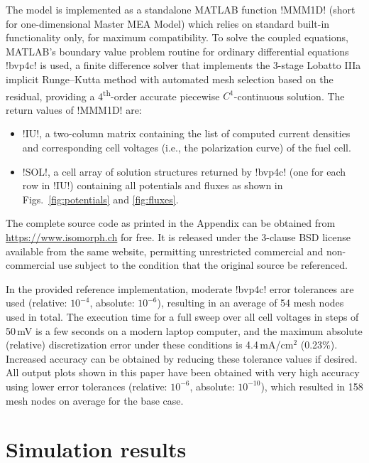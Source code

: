 \documentclass[fontsize=9pt,DIV=calc,a4paper,twocolumn]{scrartcl}
\begin{document}
The model is implemented as a standalone MATLAB function !MMM1D! (short for one-dimensional Master MEA Model) which relies on standard built-in functionality only, for maximum compatibility. To solve the coupled equations, MATLAB's boundary value problem routine for ordinary differential equations !bvp4c! \cite{kierzenka:01} is used, a finite difference solver that implements the 3-stage Lobatto IIIa implicit Runge--Kutta method with automated mesh selection based on the residual, providing a 4\textsuperscript{th}-order accurate piecewise $C^1$-continuous solution. The return values of !MMM1D! are:
\begin{itemize}
\item !IU!, a two-column matrix containing the list of computed current densities and corresponding cell voltages (i.e., the polarization curve) of the fuel cell.
\item !SOL!, a cell array of solution structures returned by !bvp4c! (one for each row in !IU!) containing all potentials and fluxes as shown in Figs.~\ref{fig:potentials} and \ref{fig:fluxes}.
\end{itemize}
The complete source code as printed in the Appendix can be obtained from \url{https://www.isomorph.ch} for free. It is released under the 3-clause BSD license available from the same website, permitting unrestricted commercial and non-commercial use subject to the condition that the original source be referenced.

In the provided reference implementation, moderate !bvp4c! error tolerances are used (relative: $10^{-4}$, absolute: $10^{-6}$), resulting in an average of 54 mesh nodes used in total. The execution time for a full sweep over all cell voltages in steps of 50\,mV is a few seconds on a modern laptop computer, and the maximum absolute (relative) discretization error under these conditions is 4.4\,mA/cm$^2$ (0.23\%). Increased accuracy can be obtained by reducing these tolerance values if desired. All output plots shown in this paper have been obtained with very high accuracy using lower error tolerances (relative: $10^{-6}$, absolute: $10^{-10}$), which resulted in 158 mesh nodes on average for the base case.

\section{Simulation results}
\end{document}
